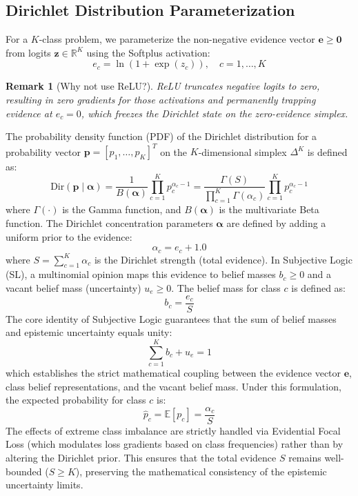 \documentclass[letterpaper]{article} %
\newcommand{\Dir}{\text{Dir}}
\newcommand{\R}{\mathbb{R}}
\newcommand{\E}{\mathbb{E}}
\newtheorem{remark}{Remark}
\begin{document}
\subsection{Dirichlet Distribution Parameterization}
For a $K$-class problem, we parameterize the non-negative evidence vector $\bm{e} \ge \bm{0}$ from logits $\bm{z} \in \R^K$ using the Softplus activation:
\begin{equation}\label{eq:softplus}
    e_c = \ln(1 + \exp(z_c)), \quad c = 1, \ldots, K
\end{equation}
\begin{remark}[Why not use ReLU?]
ReLU truncates negative logits to zero, resulting in zero gradients for those activations and permanently trapping evidence at $e_c = 0$, which freezes the Dirichlet state on the zero-evidence simplex.
\end{remark}
The probability density function (PDF) of the Dirichlet distribution for a probability vector $\bm{p} = [p_1, \dots, p_K]^T$ on the $K$-dimensional simplex $\Delta^K$ is defined as:
\begin{equation}\label{eq:dirichlet_pdf}
    \Dir(\bm{p} \mid \bm{\alpha}) = \frac{1}{B(\bm{\alpha})} \prod_{c=1}^K p_c^{\alpha_c - 1} = \frac{\Gamma(S)}{\prod_{c=1}^K \Gamma(\alpha_c)} \prod_{c=1}^K p_c^{\alpha_c - 1}
\end{equation}
where $\Gamma(\cdot)$ is the Gamma function, and $B(\bm{\alpha})$ is the multivariate Beta function. The Dirichlet concentration parameters $\bm{\alpha}$ are defined by adding a uniform prior to the evidence:
\begin{equation}\label{eq:alpha}
    \alpha_c = e_c + 1.0
\end{equation}
where $S = \sum_{c=1}^K \alpha_c$ is the Dirichlet strength (total evidence). In Subjective Logic (SL), a multinomial opinion maps this evidence to belief masses $b_c \ge 0$ and a vacant belief mass (uncertainty) $u_e \ge 0$. The belief mass for class $c$ is defined as:
\begin{equation}\label{eq:belief}
    b_c = \frac{e_c}{S}
\end{equation}
The core identity of Subjective Logic guarantees that the sum of belief masses and epistemic uncertainty equals unity:
\begin{equation}\label{eq:sl_identity}
    \sum_{c=1}^K b_c + u_e = 1
\end{equation}
which establishes the strict mathematical coupling between the evidence vector $\bm{e}$, class belief representations, and the vacant belief mass. Under this formulation, the expected probability for class $c$ is:
\begin{equation}\label{eq:p_hat}
    \hat{p}_c = \E[p_c] = \frac{\alpha_c}{S}
\end{equation}
The effects of extreme class imbalance are strictly handled via Evidential Focal Loss (which modulates loss gradients based on class frequencies) rather than by altering the Dirichlet prior. This ensures that the total evidence $S$ remains well-bounded ($S \ge K$), preserving the mathematical consistency of the epistemic uncertainty limits.
\end{document}
